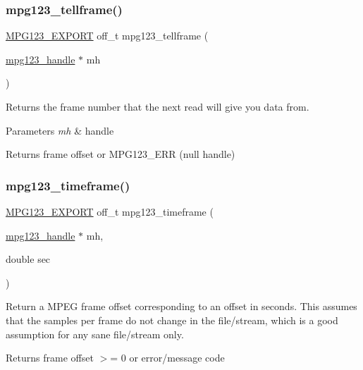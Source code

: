 \subsubsection{\texorpdfstring{mpg123\_tellframe()}{mpg123\_tellframe()}}
{\footnotesize\ttfamily \mbox{\hyperlink{mpg123_8h_a2ba98cfba3f760879df70e755b2a61cc}{M\+P\+G123\+\_\+\+E\+X\+P\+O\+RT}} off\+\_\+t mpg123\+\_\+tellframe (\begin{DoxyParamCaption}\item[{\mbox{\hyperlink{group__mpg123__init_ga6728e2839a395f3a07d4514da659faca}{mpg123\+\_\+handle}} $\ast$}]{mh }\end{DoxyParamCaption})}

Returns the frame number that the next read will give you data from. 
\begin{DoxyParams}{Parameters}
{\em mh} & handle \\
\hline
\end{DoxyParams}
\begin{DoxyReturn}{Returns}
frame offset or M\+P\+G123\+\_\+\+E\+RR (null handle) 
\end{DoxyReturn}
\mbox{\label{group__mpg123__seek_gab6c3b85832ef3de29aafdb0ef790043b}} 
\subsubsection{\texorpdfstring{mpg123\_timeframe()}{mpg123\_timeframe()}}
{\footnotesize\ttfamily \mbox{\hyperlink{mpg123_8h_a2ba98cfba3f760879df70e755b2a61cc}{M\+P\+G123\+\_\+\+E\+X\+P\+O\+RT}} off\+\_\+t mpg123\+\_\+timeframe (\begin{DoxyParamCaption}\item[{\mbox{\hyperlink{group__mpg123__init_ga6728e2839a395f3a07d4514da659faca}{mpg123\+\_\+handle}} $\ast$}]{mh,  }\item[{double}]{sec }\end{DoxyParamCaption})}

Return a M\+P\+EG frame offset corresponding to an offset in seconds. This assumes that the samples per frame do not change in the file/stream, which is a good assumption for any sane file/stream only. \begin{DoxyReturn}{Returns}
frame offset $>$= 0 or error/message code 
\end{DoxyReturn}
